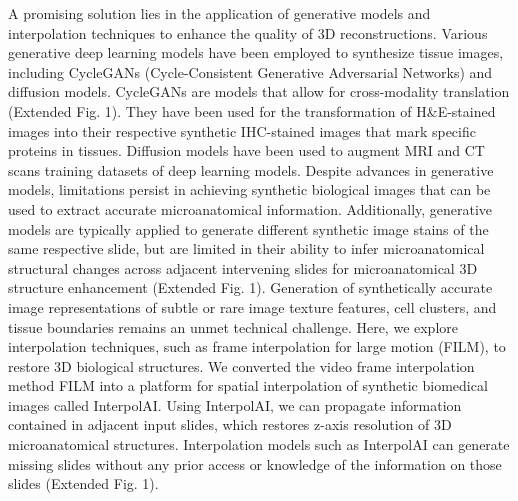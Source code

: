 \begin{refsection}
    A promising solution lies in the application of generative models and interpolation techniques to enhance the quality of 3D reconstructions. Various generative deep learning models have been employed to synthesize tissue images, including CycleGANs (Cycle-Consistent Generative Adversarial Networks) and diffusion models\cite{khader2023a,kazerouni2023a,bai-a,koivukoski2023a,kang2022a,deshpande2024a,li2023a,cross-zamirski2023a}. CycleGANs are models that allow for cross-modality translation (Extended Fig. 1). They have been used for the transformation of H\&E-stained images into their respective synthetic IHC-stained images that mark specific proteins in tissues\cite{bai-a,koivukoski2023a,kang2022a,xu2019a}.  Diffusion models have been used to augment MRI and CT scans training datasets of deep learning models\cite{khader2023a,li2023a,ho2020a}. 
    Despite advances in generative models, limitations persist in achieving synthetic biological images that can be used to extract accurate microanatomical information\cite{khader2023a,kazerouni2023a,bai-a,koivukoski2023a,kang2022a,deshpande2024a,li2023a,cross-zamirski2023a,gaffling-a,leng2013a,akhtar2010a}. Additionally, generative models are typically applied to generate different synthetic image stains of the same respective slide, but are limited in their ability to infer microanatomical structural changes across adjacent intervening slides for microanatomical 3D structure enhancement (Extended Fig. 1). Generation of synthetically accurate image representations of subtle or rare image texture features, cell clusters, and tissue boundaries remains an unmet technical challenge\cite{kazerouni2023a,deshpande2024a}. Here, we explore interpolation techniques, such as frame interpolation for large motion (FILM), to restore 3D biological structures\cite{gaffling-a,leng2013a,akhtar2010a,reda-a}. We converted the video frame interpolation method FILM into a platform for spatial interpolation of synthetic biomedical images called InterpolAI. Using InterpolAI, we can propagate information contained in adjacent input slides, which restores z-axis resolution of 3D microanatomical structures. Interpolation models such as InterpolAI can generate missing slides without any prior access or knowledge of the information on those slides (Extended Fig. 1).

\end{refsection}
